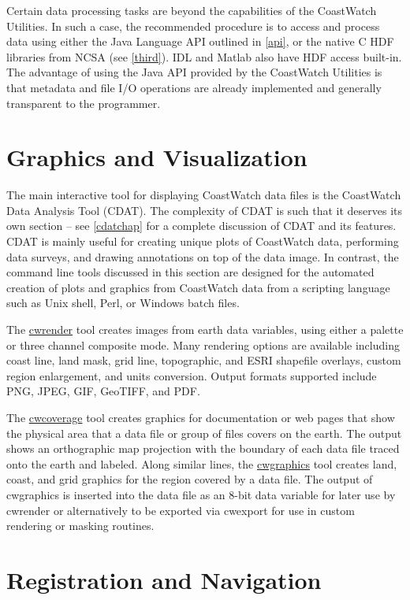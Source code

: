 Certain data processing tasks are beyond the capabilities of the
CoastWatch Utilities.  In such a case, the recommended procedure
is to access and process data using either the Java Language API
outlined in \autoref{api}, or the native C HDF libraries from NCSA
(see \autoref{third}).  IDL and Matlab also have HDF access built-in.
The advantage of using the Java API provided by the CoastWatch
Utilities is that metadata and file I/O operations are already
implemented and generally transparent to the programmer.

\section{Graphics and Visualization}

The main interactive tool for displaying CoastWatch data files is the
CoastWatch Data Analysis Tool (CDAT).  The complexity of CDAT is such
that it deserves its own section -- see \autoref{cdatchap} for a
complete discussion of CDAT and its features.  CDAT is mainly useful
for creating unique plots of CoastWatch data, performing data
surveys, and drawing annotations on top of the data image.  In
contrast, the command line tools discussed in this section are designed
for the automated creation of plots and graphics from CoastWatch data
from a scripting language such as Unix shell, Perl, or Windows batch
files.

The \hyperlink{cwrender}{cwrender} tool creates images from earth data
variables, using either a palette or three channel composite mode.
Many rendering options are available including coast line, land mask,
grid line, topographic, and ESRI shapefile overlays, custom region
enlargement, and units conversion.  Output formats supported include
PNG, JPEG, GIF, GeoTIFF, and PDF.

The \hyperlink{cwcoverage}{cwcoverage} tool creates
graphics for documentation or web pages that show the physical area
that a data file or group of files covers on the earth.  The output
shows an orthographic map projection with the boundary of each data
file traced onto the earth and labeled.  Along similar lines, the
\hyperlink{cwgraphics}{cwgraphics} tool creates land, coast, and grid 
graphics for the region covered by a data file.  The output of
cwgraphics is inserted into the data file as an 8-bit data variable
for later use by cwrender or alternatively to be exported via cwexport
for use in custom rendering or masking routines.

\section{Registration and Navigation}
\label{registration}

